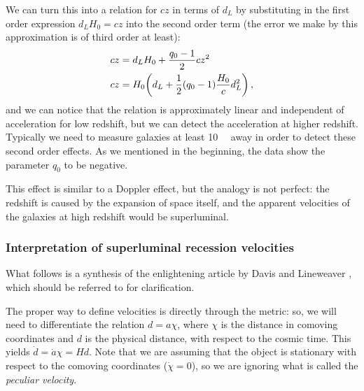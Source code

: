 \documentclass[main.tex]{subfiles}
\begin{document}
We can turn this into a relation for \(cz\) in terms of \(d_L\) by substituting in the first order expression \(d_L H_0 = cz\) into the second order term (the error we make by this approximation is of third order at least):
\begin{align}
cz &= d_L H_0 + \frac{q_0 -1}{2} cz^2 \\
cz &= H_0 \qty(d_L + \frac{1}{2} (q_0 -1 ) \frac{H_0}{c} d_L^2)\,,
\end{align}
%
and we can notice that the relation is approximately linear and independent of acceleration for low redshift, but we can detect the acceleration at higher redshift.
Typically we need to measure galaxies at least \SI{10}{\mega\parsec} away in order to detect these second order effects.
As we mentioned in the beginning, the data show the parameter \(q_0 \) to be negative.

This effect is similar to a Doppler effect, but the analogy is not perfect: the redshift is caused by the expansion of space itself, and the apparent velocities of the galaxies at high redshift would be superluminal. 

\subsubsection{Interpretation of superluminal recession velocities}

What follows is a synthesis of the enlightening article by Davis and Lineweaver \cite[]{davisExpandingConfusionCommon2004}, which should be referred to for clarification.

The proper way to define velocities is directly through the metric: so, we will need to differentiate the relation \(d = a \chi \), where \(\chi \) is the distance in comoving coordinates and \(d\) is the physical distance, with respect to the cosmic time. This yields \(\dot{d} = \dot{a} \chi = H d\).
Note that we are assuming that the object is stationary with respect to the comoving coordinates (\(\dot{\chi} = 0\)), so we are ignoring what is called the \emph{peculiar velocity}. 
\end{document}
